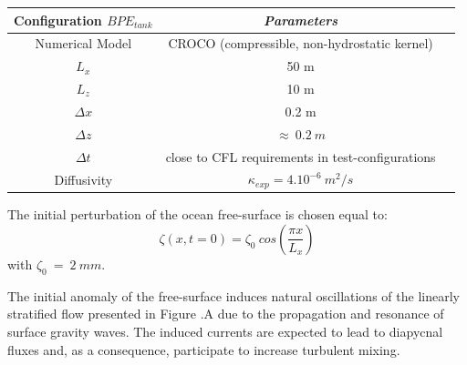 \begin{table}[h]
        \centering
        \begin{tabular}{|c|c|c|}
                \hline
                Configuration $BPE_{tank}$ & \textit{Parameters}\\
                \hline 
                Numerical Model & CROCO (compressible, non-hydrostatic kernel)\\
                $L_x$ & 50 m\\
                $L_z$ & 10 m\\
                $\Delta x$ & 0.2 m\\
                $\Delta z$ & $\approx\ 0.2\ m$\\
                $\Delta t$ & close to CFL requirements in test-configurations\\
                Diffusivity & $\kappa_{exp} = 4.10^{-6} \ m^2/s$\\
                \hline
        \end{tabular}
        \label{tab_BPE_TANK}
\end{table}
The initial perturbation of the ocean free-surface is chosen equal to:
\begin{equation}
\displaystyle
\zeta(x,t=0)=\zeta_0\ cos\left(\frac{\pi x}{L_x}\right)
\end{equation}
with $\zeta_0\ =\ 2\ mm$.

The initial anomaly of the free-surface induces natural oscillations of the linearly stratified flow presented in Figure .A due to the propagation and resonance of surface gravity waves. The induced currents are expected to lead to diapycnal fluxes and, as a consequence, participate to increase turbulent mixing.

